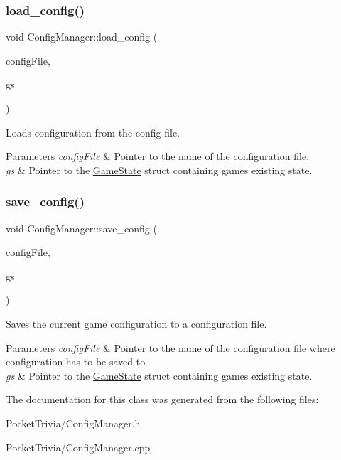 \subsubsection{\texorpdfstring{load\_config()}{load\_config()}}
{\footnotesize\ttfamily void Config\+Manager\+::load\+\_\+config (\begin{DoxyParamCaption}\item[{const char $\ast$}]{config\+File,  }\item[{\mbox{\hyperlink{struct_game_state}{Game\+State}} $\ast$}]{gs }\end{DoxyParamCaption})}



Loads configuration from the config file. 


\begin{DoxyParams}{Parameters}
{\em config\+File} & Pointer to the name of the configuration file. \\
\hline
{\em gs} & Pointer to the \mbox{\hyperlink{struct_game_state}{Game\+State}} struct containing game\textquotesingle{}s existing state. \\
\hline
\end{DoxyParams}
\mbox{\label{class_config_manager_ab7cbb6809061323ec279ddd6a46833df}} 
\subsubsection{\texorpdfstring{save\_config()}{save\_config()}}
{\footnotesize\ttfamily void Config\+Manager\+::save\+\_\+config (\begin{DoxyParamCaption}\item[{const char $\ast$}]{config\+File,  }\item[{\mbox{\hyperlink{struct_game_state}{Game\+State}} $\ast$}]{gs }\end{DoxyParamCaption})}



Saves the current game configuration to a configuration file. 


\begin{DoxyParams}{Parameters}
{\em config\+File} & Pointer to the name of the configuration file where configuration has to be saved to \\
\hline
{\em gs} & Pointer to the \mbox{\hyperlink{struct_game_state}{Game\+State}} struct containing game\textquotesingle{}s existing state. \\
\hline
\end{DoxyParams}


The documentation for this class was generated from the following files\+:\begin{DoxyCompactItemize}
\item 
Pocket\+Trivia/Config\+Manager.\+h\item 
Pocket\+Trivia/Config\+Manager.\+cpp\end{DoxyCompactItemize}
